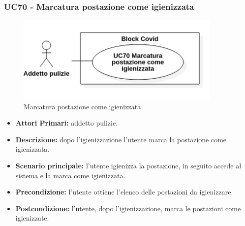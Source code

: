 \subsubsection{UC70 - Marcatura postazione come igienizzata}
\begin{figure}[H]
		\centering
		\includegraphics[width=10cm]{res/images/UC70.png}
		\caption{Marcatura postazione come igienizzata}
		\label{fig:Marcatura postazione come igienizzata}
	\end{figure}
\begin{itemize}
           	\item\textbf{Attori Primari:} addetto pulizie.
           	\item\textbf{Descrizione:} dopo l'igienizzazione l'utente marca la postazione come igienizzata.
           	\item\textbf{Scenario principale:} l'utente igienizza la postazione, in seguito accede al sistema e la marca come igienizzata.
           	\item\textbf{Precondizione:} l'utente ottiene l'elenco delle postazioni da igienizzare.
           	\item\textbf{Postcondizione:} l'utente, dopo l'igienizzazione, marca le postazioni come igienizzate.
\end{itemize}


